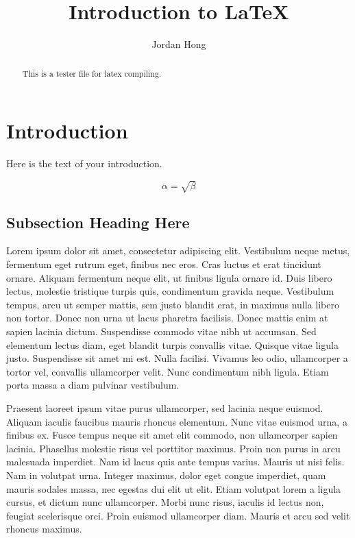 \documentclass{article}
\begin{document}
\title{Introduction to \LaTeX{}}
\author{Jordan Hong}

\maketitle

\begin{abstract}
    This is a tester file for latex compiling.
\end{abstract}

\section{Introduction}
Here is the text of your introduction.

\begin{equation}
    \label{simple_equation}
    \alpha = \sqrt{ \beta }
\end{equation}

\subsection{Subsection Heading Here}


        Lorem ipsum dolor sit amet, consectetur adipiscing elit. Vestibulum neque metus, fermentum eget rutrum eget, finibus nec eros. Cras luctus et erat tincidunt ornare. Aliquam fermentum neque elit, ut finibus ligula ornare id. Duis libero lectus, molestie tristique turpis quis, condimentum gravida neque. Vestibulum tempus, arcu ut semper mattis, sem justo blandit erat, in maximus nulla libero non tortor. Donec non urna ut lacus pharetra facilisis. Donec mattis enim at sapien lacinia dictum. Suspendisse commodo vitae nibh ut accumsan. Sed elementum lectus diam, eget blandit turpis convallis vitae. Quisque vitae ligula justo. Suspendisse sit amet mi est. Nulla facilisi. Vivamus leo odio, ullamcorper a tortor vel, convallis ullamcorper velit. Nunc condimentum nibh ligula. Etiam porta massa a diam pulvinar vestibulum.

        Praesent laoreet ipsum vitae purus ullamcorper, sed lacinia neque euismod. Aliquam iaculis faucibus mauris rhoncus elementum. Nunc vitae euismod urna, a finibus ex. Fusce tempus neque sit amet elit commodo, non ullamcorper sapien lacinia. Phasellus molestie risus vel porttitor maximus. Proin non purus in arcu malesuada imperdiet. Nam id lacus quis ante tempus varius. Mauris ut nisi felis. Nam in volutpat urna. Integer maximus, dolor eget congue imperdiet, quam mauris sodales massa, nec egestas dui elit ut elit. Etiam volutpat lorem a ligula cursus, et dictum nunc ullamcorper. Morbi nunc risus, iaculis id lectus non, feugiat scelerisque orci. Proin euismod ullamcorper diam. Mauris et arcu sed velit rhoncus maximus.
\end{document}
